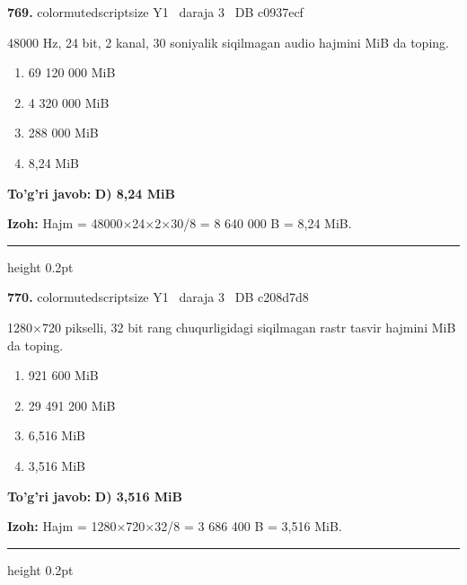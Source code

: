 \documentclass[10pt,a4paper,oneside]{article}
\begin{document}
\noindent\textbf{\color{ink}769.}  {color{muted}scriptsize Y1 \textbullet\ daraja 3 \textbullet\ DB c0937ecf}
\par
48000 Hz, 24 bit, 2 kanal, 30 soniyalik siqilmagan audio hajmini MiB da toping.
\begin{enumerate}[label=\Alph*),leftmargin=9mm]
\item 69 120 000 MiB
\item 4 320 000 MiB
\item 288 000 MiB
\item 8,24 MiB
\end{enumerate}
\begin{tcolorbox}[enhanced,breakable,colback=teal!4,colframe=teal!50!black,boxrule=0.5pt,arc=1.1mm,left=3mm,right=3mm,top=1.7mm,bottom=1.7mm,before skip=2mm,after skip=2mm]
\textbf{\color{teal}To'g'ri javob:} \textbf{D) 8,24 MiB}
\par\smallskip
\textbf{Izoh:} Hajm = 48000\ensuremath{\times}24\ensuremath{\times}2\ensuremath{\times}30/8 = 8 640 000 B = 8,24 MiB.
\end{tcolorbox}
\vspace{2mm}\hrule height 0.2pt \vspace{3mm}

\noindent\textbf{\color{ink}770.}  {color{muted}scriptsize Y1 \textbullet\ daraja 3 \textbullet\ DB c208d7d8}
\par
1280\ensuremath{\times}720 pikselli, 32 bit rang chuqurligidagi siqilmagan rastr tasvir hajmini MiB da toping.
\begin{enumerate}[label=\Alph*),leftmargin=9mm]
\item 921 600 MiB
\item 29 491 200 MiB
\item 6,516 MiB
\item 3,516 MiB
\end{enumerate}
\begin{tcolorbox}[enhanced,breakable,colback=teal!4,colframe=teal!50!black,boxrule=0.5pt,arc=1.1mm,left=3mm,right=3mm,top=1.7mm,bottom=1.7mm,before skip=2mm,after skip=2mm]
\textbf{\color{teal}To'g'ri javob:} \textbf{D) 3,516 MiB}
\par\smallskip
\textbf{Izoh:} Hajm = 1280\ensuremath{\times}720\ensuremath{\times}32/8 = 3 686 400 B = 3,516 MiB.
\end{tcolorbox}
\vspace{2mm}\hrule height 0.2pt \vspace{3mm}
\end{document}
